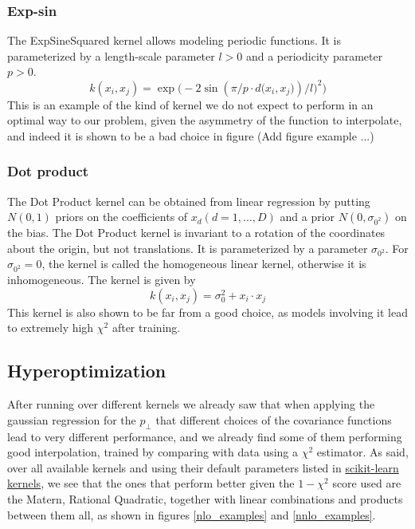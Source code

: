 \documentclass[12pt]{article}
\begin{document}
\subsubsection{Exp-sin}
The ExpSineSquared kernel allows modeling periodic functions. It is parameterized by a length-scale parameter $l > 0$ and a periodicity parameter $p > 0$.
\begin{equation}
k(x_{i}, x_{j}) = \exp \Bigg( -2 \sin(\pi/p \cdot d\big(x_{i}, x_{j}\big) ) /l )^{2} \Bigg)
\end{equation}
This is an example of the kind of kernel we do not expect to perform in an optimal way to our problem, given the asymmetry of the function to interpolate, and indeed it is shown to be a bad choice in figure (Add figure example ...)

\subsubsection{Dot product}
The Dot Product kernel can be obtained from linear regression by putting $N(0, 1)$ priors on the coefficients of $x_{d}(d = 1, ..., D)$ and a prior $N(0, \sigma_{0^{2}})$ on the bias. The Dot Product kernel is invariant to a rotation of the coordinates about the origin, but not translations. It is parameterized by a parameter $\sigma_{0^{2}}$. For $\sigma_{0^{2}} = 0$, the kernel is called the homogeneous linear kernel, otherwise it is inhomogeneous. The kernel is given by
\begin{equation}
k(x_{i}, x_{j}) = \sigma_{0}^{2} + x_{i} \cdot x_{j}
\end{equation}
This kernel is also shown to be far from a good choice, as models involving it lead to extremely high $\chi^{2}$ after training.

\newpage

\subsection{Hyperoptimization}
After running over different kernels we already saw that when applying the gaussian regression for the $p_{\perp}$ that different choices of the covariance functions lead to very different performance, and we already find some of them performing good interpolation, trained by comparing with data using a $\chi^{2}$ estimator. As said, over all available kernels and using their default parameters listed in \href{https://scikit-learn.org/stable/modules/classes.html#module-sklearn.gaussian_process}{ scikit-learn kernels}, we see that the ones that perform better given the $1 - \chi^{2}$ score used are the Matern, Rational Quadratic, together with linear combinations and products between them all, as shown in figures \ref{nlo_examples} and \ref{nnlo_examples}.
\end{document}
